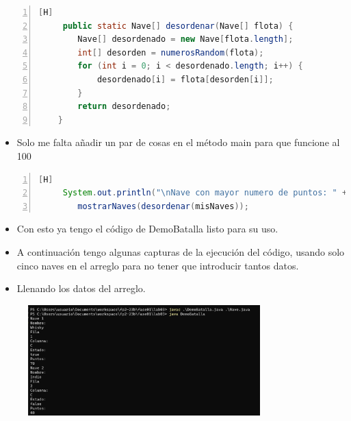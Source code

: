\documentclass{article}
\begin{document}
	\begin{lstlisting}[language=java,caption={Desordenar arreglo}, numbers=left][H]
	 public static Nave[] desordenar(Nave[] flota) {
        Nave[] desordenado = new Nave[flota.length];
        int[] desorden = numerosRandom(flota);
        for (int i = 0; i < desordenado.length; i++) {
            desordenado[i] = flota[desorden[i]];
        }
        return desordenado;
    }
	\end{lstlisting}
	\begin{itemize}	
		\item Solo me falta añadir un par de cosas en el método main para que funcione al 100%
	\end{itemize}
	\begin{lstlisting}[language=java,caption={Método main}, numbers=left][H]
	 System.out.println("\nNave con mayor numero de puntos: " + mostrarMayorPuntos(misNaves).getNombre());
        mostrarNaves(desordenar(misNaves));
	\end{lstlisting}
	\begin{itemize}	
		\item Con esto ya tengo el código de DemoBatalla listo para su uso.
		\item A continuación tengo algunas capturas de la ejecución del código, usando solo cinco naves en el arreglo para no tener que introducir tantos datos.
	\end{itemize}
	\begin{itemize}
		\item Llenando los datos del arreglo.
	\end{itemize}

	\begin{figure}[H]
		\centering		\includegraphics[width=0.8\textwidth,keepaspectratio]{img/captura1.png}
	\end{figure}
	
\end{document}
